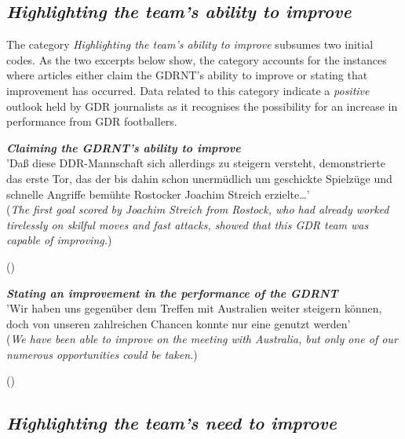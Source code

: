 \subsection*{\textit{Highlighting the team’s ability to improve}}

The category \textit{Highlighting the team’s ability to improve} subsumes two initial codes. As the two excerpts below show, the category accounts for the instances where articles either claim the GDRNT’s ability to improve or stating that improvement has occurred. Data related to this category indicate a \textit{positive} outlook held by GDR journalists as it recognises the possibility for an increase in performance from GDR footballers.

\begin{displayquote}
\begin{small}
\textbf{\textit{Claiming the GDRNT’s ability to improve}}\\
'Daß diese DDR-Mannschaft sich allerdings zu steigern versteht, demonstrierte das erste Tor, das der bis dahin schon unermüdlich um geschickte Spielzüge und schnelle Angriffe bemühte Rostocker Joachim Streich erzielte…'\\
(\textit{The first goal scored by Joachim Streich from Rostock, who had already worked tirelessly on skilful moves and fast attacks, showed that this GDR team was capable of improving.})\
\begin{flushright}\footnotesize (\cite{nd19740530})\end{flushright}
\end{small}
\end{displayquote}

\begin{displayquote}
\begin{small}
\textbf{\textit{Stating an improvement in the performance of the GDRNT}}\\
'Wir haben uns gegenüber dem Treffen mit Australien weiter steigern können, doch von unseren zahlreichen Chancen konnte nur eine genutzt werden'\\
(\textit{We have been able to improve on the meeting with Australia, but only one of our numerous opportunities could be taken.})\
\begin{flushright}\footnotesize (\cite{nd19740619})\end{flushright}
\end{small}
\end{displayquote}

\subsection*{\textit{Highlighting the team’s need to improve}}

